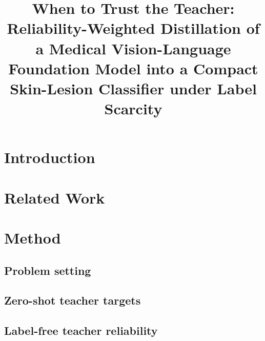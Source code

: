 \documentclass[journal,twoside,web]{IEEEtran}
\begin{document}
\title{When to Trust the Teacher: Reliability-Weighted Distillation of a Medical Vision-Language
Foundation Model into a Compact Skin-Lesion Classifier under Label Scarcity}
\author{%
}
\maketitle

\begin{abstract}
\end{abstract}
\begin{IEEEkeywords}
\end{IEEEkeywords}

\section{Introduction}

\section{Related Work}

\section{Method}
\subsection{Problem setting}
\subsection{Zero-shot teacher targets}
\subsection{Label-free teacher reliability}
\end{document}
